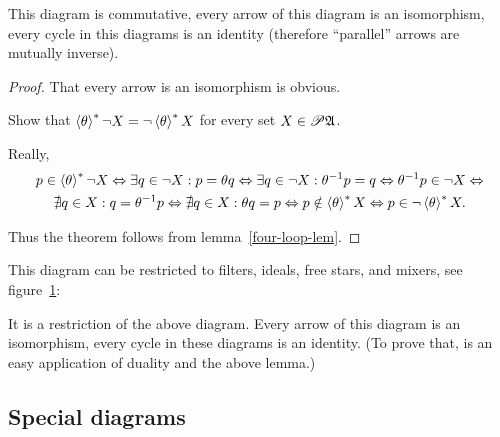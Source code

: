 \begin{thm}
This diagram is commutative, every arrow of this diagram is an isomorphism,
every cycle in this diagrams is an identity (therefore ``parallel''
arrows are mutually inverse).\end{thm}
\begin{proof}
That every arrow is an isomorphism is obvious.

Show that $\left\langle \theta\right\rangle ^{\ast}\lnot X=\lnot\left\langle \theta\right\rangle ^{\ast}X$ for every
set $X\in\mathscr{P}\mathfrak{A}$.

Really,
\begin{multline*}
p\in\left\langle \theta\right\rangle ^{\ast}\lnot X\Leftrightarrow\exists q\in\lnot X:p=\theta q\Leftrightarrow\exists q\in\lnot X:\theta^{-1}p=q\Leftrightarrow\theta^{-1}p\in\lnot X\Leftrightarrow\\
\nexists q\in X:q=\theta^{-1}p\Leftrightarrow\nexists q\in X:\theta q=p\Leftrightarrow p\notin\left\langle \theta\right\rangle ^{\ast}X\Leftrightarrow p\in\lnot\left\langle \theta\right\rangle ^{\ast}X.
\end{multline*}


Thus the theorem follows from lemma~\ref{four-loop-lem}.
\end{proof}
This diagram can be restricted to filters, ideals, free stars, and
mixers, see figure~\ref{theta-flt}:

\begin{figure}[ht]
\caption{\label{theta-flt}}
\end{figure}

\begin{thm}
It is a restriction of the above diagram. Every arrow of this diagram
is an isomorphism, every cycle in these diagrams is an identity. (To
prove that, is an easy application of duality and the above lemma.)
\end{thm}

\subsection{Special diagrams}

